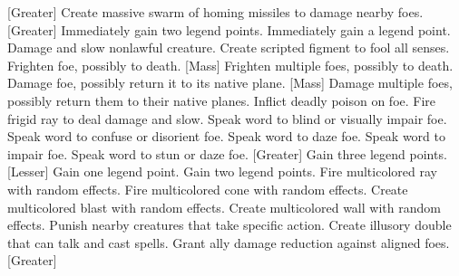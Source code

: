[Greater]
    {Create massive swarm of homing missiles to damage nearby foes.}
[Greater]
    {Immediately gain two legend points.}
    {Immediately gain a legend point.}
    {Damage and slow nonlawful creature.}
    {Create scripted figment to fool all senses.}
    {Frighten foe, possibly to death.}
[Mass]
    {Frighten multiple foes, possibly to death.}
    {Damage foe, possibly return it to its native plane.}
[Mass]
    {Damage multiple foes, possibly return them to their native planes.}
    {Inflict deadly poison on foe.}
    {Fire frigid ray to deal damage and slow.}
    {Speak word to blind or visually impair foe.}
    {Speak word to confuse or disorient foe.}
    {Speak word to daze foe.}
    {Speak word to impair foe.}
    {Speak word to stun or daze foe.}
[Greater]
    {Gain three legend points.}
[Lesser]
    {Gain one legend point.}
    {Gain two legend points.}
    {Fire multicolored ray with random effects.}
    {Fire multicolored cone with random effects.}
    {Create multicolored blast with random effects.}
    {Create multicolored wall with random effects.}
    {Punish nearby creatures that take specific action.}
    {Create illusory double that can talk and cast spells.}
    {Grant ally damage reduction against aligned foes.}
[Greater]

